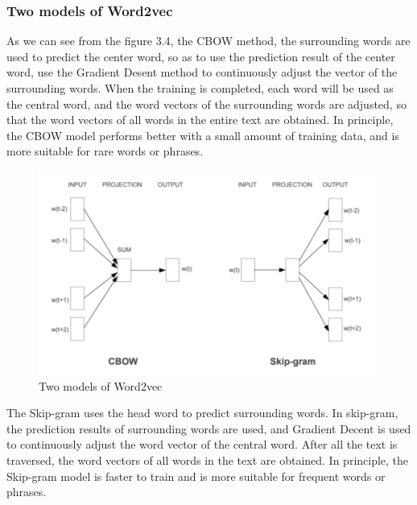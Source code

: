 \subsubsection{Two models of Word2vec}

\noindent As we can see from the figure 3.4, the CBOW method, the surrounding words are used to predict the center word, so as to use the prediction result of the center word, use the Gradient Desent method to continuously adjust the vector of the surrounding words. When the training is completed, each word will be used as the central word, and the word vectors of the surrounding words are adjusted, so that the word vectors of all words in the entire text are obtained. In principle, the CBOW model performs better with a small amount of training data, and is more suitable for rare words or phrases.\\

\begin{figure}[ht]

\centering
\includegraphics[width=12cm,height=7cm\textwidth]{images/image_largevis_word2vec.PNG}
\caption{Two models of Word2vec}
\label{fig:label}
\end{figure}



\noindent The Skip-gram uses the head word to predict surrounding words. In skip-gram, the prediction results of surrounding words are used, and Gradient Decent is used to continuously adjust the word vector of the central word. After all the text is traversed, the word vectors of all words in the text are obtained. In principle, the Skip-gram model is faster to train and is more suitable for frequent words or phrases.\\


